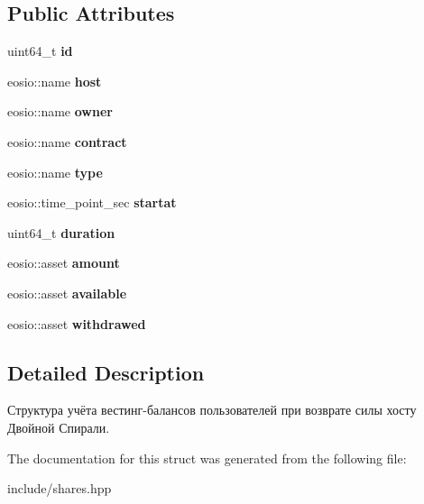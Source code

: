 \subsection*{Public Attributes}
\begin{DoxyCompactItemize}
\item 
\mbox{\label{structvesting_a6288cd23eebb2f8bd05aec23647f7d6d}} 
uint64\+\_\+t {\bfseries id}
\item 
\mbox{\label{structvesting_ab795bee0918bd741aae82e5fb3f053a8}} 
eosio\+::name {\bfseries host}
\item 
\mbox{\label{structvesting_a8cac984b9edf45bea6c467398008d3dd}} 
eosio\+::name {\bfseries owner}
\item 
\mbox{\label{structvesting_a210e4616f4ee4389d3368f2c882294f2}} 
eosio\+::name {\bfseries contract}
\item 
\mbox{\label{structvesting_ac6972755c998eb9887cce0d463dc9bdb}} 
eosio\+::name {\bfseries type}
\item 
\mbox{\label{structvesting_a75d56f291bccd7edb0fd7097b7b6727f}} 
eosio\+::time\+\_\+point\+\_\+sec {\bfseries startat}
\item 
\mbox{\label{structvesting_af9d969971c6d91333ae2282a6e05e742}} 
uint64\+\_\+t {\bfseries duration}
\item 
\mbox{\label{structvesting_a1de75a68c605d780b132c09749d957b0}} 
eosio\+::asset {\bfseries amount}
\item 
\mbox{\label{structvesting_acd1b02df1f7b77e08e64dee70c93dea5}} 
eosio\+::asset {\bfseries available}
\item 
\mbox{\label{structvesting_ab60d72a07a57b50a714c8638527fe056}} 
eosio\+::asset {\bfseries withdrawed}
\end{DoxyCompactItemize}


\subsection{Detailed Description}
Структура учёта вестинг-\/балансов пользователей при возврате силы хосту Двойной Спирали. 

The documentation for this struct was generated from the following file\+:\begin{DoxyCompactItemize}
\item 
include/shares.\+hpp\end{DoxyCompactItemize}
